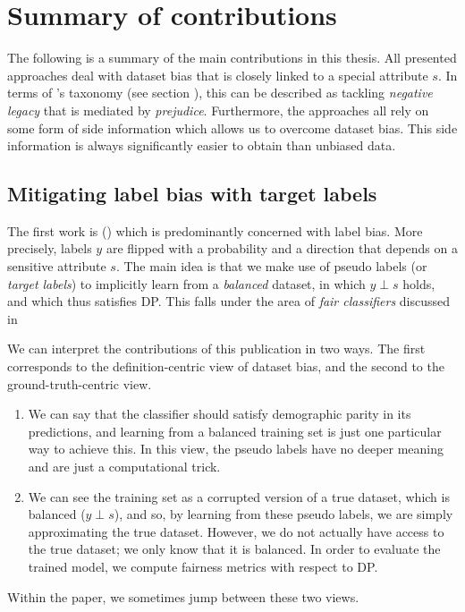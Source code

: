 \chapter{Summary of contributions}\label{ch:content}
The following is a summary of the main contributions in this thesis.
All presented approaches deal with dataset bias that is closely linked to a special attribute $s$.
In terms of \citet{kamishima2012fairness}'s taxonomy (see section ),
this can be described as tackling \emph{negative legacy} that is mediated by \emph{prejudice}.
Furthermore, the approaches all rely on some form of side information which allows us to overcome dataset bias.
This side information is always significantly easier to obtain than unbiased data.

\section{Mitigating label bias with target labels}\label{sec:target-labels}
The first work is \citet{kehrenberg2020tuning} ()
which is predominantly concerned with label bias.
More precisely, labels \(y\) are flipped with a probability and a direction that depends on a sensitive attribute \(s\).
The main idea is that we make use of pseudo labels (or \emph{target labels})
to implicitly learn from a \emph{balanced} dataset,
in which \(y\perp s\) holds, and which thus satisfies \acf{DP}.
This falls under the area of \emph{fair classifiers} discussed in 

We can interpret the contributions of this publication in two ways.
The first corresponds to the definition-centric view of dataset bias,
and the second to the ground-truth-centric view.
\begin{enumerate}
  \item
    We can say that the classifier should satisfy demographic parity in its predictions,
    and learning from a balanced training set is just one particular way to achieve this.
    In this view, the pseudo labels have no deeper meaning and are just a computational trick.
  \item
    We can see the training set as a corrupted version of a true dataset, which is balanced (\(y\perp s\)),
    and so, by learning from these pseudo labels, we are simply approximating the true dataset.
    However, we do not actually have access to the true dataset; we only know that it is balanced.
    In order to evaluate the trained model, we compute fairness metrics with respect to \ac{DP}.
\end{enumerate}
Within the paper, we sometimes jump between these two views.

